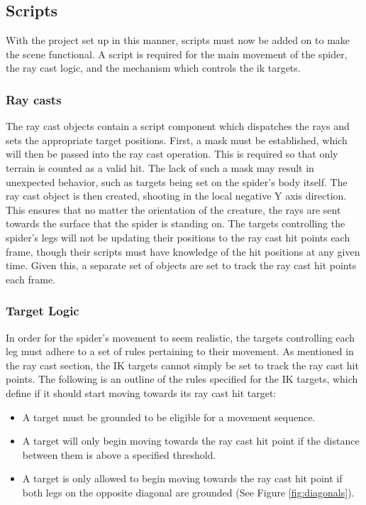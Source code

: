 \subsection{Scripts}
With the project set up in this manner, scripts must now be added on to make the
scene functional. A script is required for the main movement of the spider, the
ray cast logic, and the mechanism which controls the ik targets.

\subsubsection{Ray casts}
The ray cast objects contain a script component which dispatches the rays and
sets the appropriate target positions. First, a mask must be established, which
will then be passed into the ray cast operation. This is required so that only
terrain is counted as a valid hit. The lack of such a mask may result in
unexpected behavior, such as targets being set on the spider's body itself. The
ray cast object is then created, shooting in the local negative Y axis
direction. This ensures that no matter the orientation of the creature, the rays
are sent towards the surface that the spider is standing on. The targets
controlling the spider's legs will not be updating their positions to the
ray cast hit points each frame, though their scripts must have knowledge of the
hit positions at any given time. Given this, a separate set of objects are set
to track the ray cast hit points each frame.

\subsubsection{Target Logic}
In order for the spider's movement to seem realistic, the targets controlling
each leg must adhere to a set of rules pertaining to their movement. As
mentioned in the ray cast section, the IK targets cannot simply be set to track
the ray cast hit points. The following is an outline of the rules specified for
the IK targets, which define if it should start moving towards its ray cast hit
target:
\begin{itemize}
    \item A target must be grounded to be eligible for a movement sequence.

    \item A target will only begin moving towards the ray cast hit point if the
        distance between them is above a specified threshold.

    \item A target is only allowed to begin moving towards the ray cast hit
        point if both legs on the opposite diagonal are grounded (See Figure
        \ref{fig:diagonals}).
\end{itemize}


